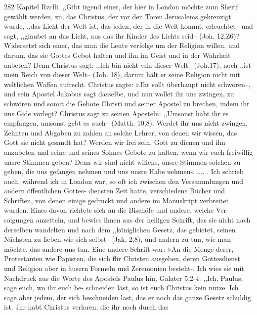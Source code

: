 282 Kapitel Rzclli.
,,Gibt irgend einer, der hier in London möchte zum Sherif
gewählt werden, zu, das Christus, der vor den Toren Jerusalems
gekreuzigt wurde, ,,das Licht der Welt ist, das jeden, der in die
Welt kommt, erleuchtet-- und sagt, ,,glaubet an das Licht, aus das
ihr Kinder des Lichts seid-- (Joh. 12,Z6)? Widersetzt sich einer,
das man die Leute verfolge um der Religion willen, und darum, das
sie Gottes Gebot halten und ihn im Geist und in der Wahrheit
anbeten? Denn Christus sagt: ,,Ich bin nicht vdn dieser Welt--
(Joh.17), noch ,,ist mein Reich von dieser Welt-- (Joh. 18), darum
hält er seine Religion nicht mit weltlichen Waffen aufrecht. Christus
sagte: »Jhr sollt überhaupt nicht schwören--, und sein Apostel
Jakobus sagt dasselbe, und nun wollet ihr uns zwingen, zu
schwören und somit die Gebote Christi und seiner Apostel zu
brechen, indem ihr uns Gide vorlegt? Christus sagt zu seinen
Aposteln: ,,Umsonst habt ihr es empfangen, umsonst gebt es
auch-- (Matth. 10,8). Werdet ihr uns nicht zwingen, Zehnten
und Abgaben zu zahlen an solche Lehrer, von denen wir wissen,
das Gott sie nicht gesandt hat? Werden wir frei sein, Gott
zu dienen und ihn anzubeten und seine und seines Sohnes Gebote
zu halten, wenn wir euch freiwillig unsre Stimmen geben? Denn
wir sind nicht willens, unsre Stimmen solchen zu geben, die uns
gefangen nehmen und uns unsre Habe uehmen« .... .
Ich schrieb auch, während ich in London war, so oft ich
zwischen den Versammlungen und andern öffentlichen Gottes-
diensten Zeit hatte, verschiedene Bücher und Schriften, von denen
einige gedruckt und andere im Manuskript verbreitet wurden.
Eines davon richtete sich an die Bischöfe und andere, welche Ver-
solgungen anzetteln, und bewies ihnen aus der heiligen Schrift,
das sie nicht nach derselben wandelten und nach dem ,,königlichen
Gesetz, das gebietet, seinen Nächsten zu lieben wie sich selbst--
[Jak. 2,8), und andern zu tun, wie man möchte, das andere uns
tun. Eine andere Schrift war: »An die Menge derer, Protestanten
wie Papisten, die sich flir Christen ausgeben, deren Gottesdienst
und Religion aber in äusern Formeln und Zeremonien besteht-.
Ich wies sie mit Nachdruck aus die Worte des Apostels Paulus
hin, Galater 5,2-4: ,,Ich, Paulus, sage euch, wo ihr euch be-
schneiden läst, so ist euch Christus kein nütze. Ich sage aber
jedem, der sich beschneiden läst, das er noch das ganze Gesetz
schuldig ist. Jhr habt Christus verloren, die ihr noch durch das


